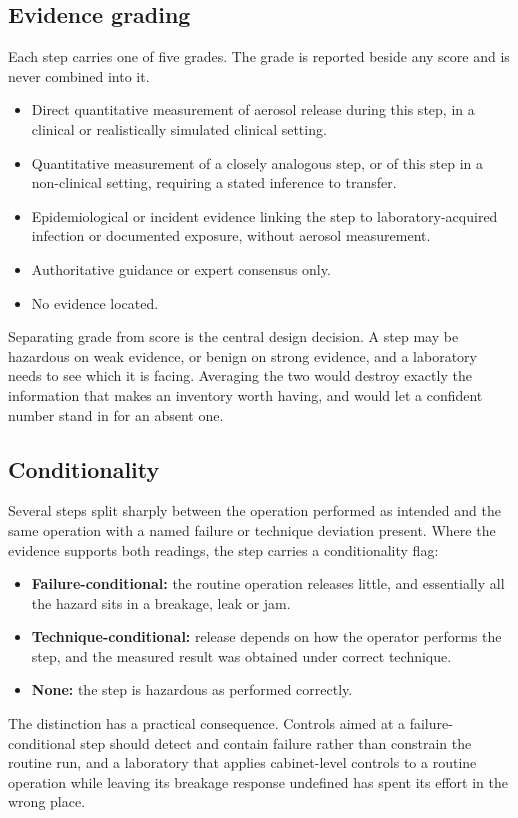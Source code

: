 \subsection{Evidence grading}

Each step carries one of five grades. The grade is reported beside any score
and is never combined into it.

\begin{itemize}
\item[\textbf{E1}] Direct quantitative measurement of aerosol release during
  this step, in a clinical or realistically simulated clinical setting.
\item[\textbf{E2}] Quantitative measurement of a closely analogous step, or of
  this step in a non-clinical setting, requiring a stated inference to transfer.
\item[\textbf{E3}] Epidemiological or incident evidence linking the step to
  laboratory-acquired infection or documented exposure, without aerosol
  measurement.
\item[\textbf{E4}] Authoritative guidance or expert consensus only.
\item[\textbf{E5}] No evidence located.
\end{itemize}

Separating grade from score is the central design decision. A step may be
hazardous on weak evidence, or benign on strong evidence, and a laboratory
needs to see which it is facing. Averaging the two would destroy exactly the
information that makes an inventory worth having, and would let a confident
number stand in for an absent one.

\subsection{Conditionality}

Several steps split sharply between the operation performed as intended and the
same operation with a named failure or technique deviation present. Where the
evidence supports both readings, the step carries a conditionality flag:

\begin{itemize}
\item \textbf{Failure-conditional:} the routine operation releases little, and
  essentially all the hazard sits in a breakage, leak or jam.
\item \textbf{Technique-conditional:} release depends on how the operator
  performs the step, and the measured result was obtained under correct
  technique.
\item \textbf{None:} the step is hazardous as performed correctly.
\end{itemize}

The distinction has a practical consequence. Controls aimed at a
failure-conditional step should detect and contain failure rather than
constrain the routine run, and a laboratory that applies cabinet-level controls
to a routine operation while leaving its breakage response undefined has spent
its effort in the wrong place.
